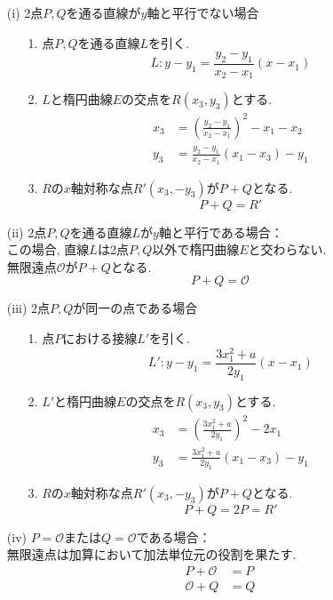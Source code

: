 \begin{enumerate}
  \item[(i)　] 2点$P,Q$を通る直線が$y$軸と平行でない場合%
  \begin{enumerate}
    \item[1.　] 点$P,Q$を通る直線$L$を引く.
    \[
      L : y-y_1 = \frac{y_2-y_1}{x_2-x_1}(x-x_1)
    \]
    \item[2.　] $L$と楕円曲線$E$の交点を$R(x_3,y_3)$とする.
    \[
    \begin{aligned}
      x_3 &= \left(\frac{y_2-y_1}{x_2-x_1}\right)^2-x_1-x_2\\
      y_3 &= \frac{y_2-y_1}{x_2-x_1}(x_1-x_3)-y_1
    \end{aligned}
    \]
    \item[3.　] $R$の$x$軸対称な点$R'(x_3,-y_3)$が$P+Q$となる.
    \[
      P+Q=R'
    \]
  \end{enumerate}
  \item[(ii)　] 2点$P,Q$を通る直線$L$が$y$軸と平行である場合：\\
  \indent この場合, 直線$L$は2点$P,Q$以外で楕円曲線$E$と交わらない.\\ 
  \indent 無限遠点$\mathcal{O}$が$P+Q$となる.
  \[
    P+Q=\mathcal{O}
  \]
  \item[(iii)　] 2点$P,Q$が同一の点である場合%
  \begin{enumerate}
    \item[1.　] 点$P$における接線$L'$を引く. 
    \[
      L' : y-y_1 = \frac{3x_1^2 + a}{2y_1}(x - x_1)
    \] 
    \item[2.　] $L'$と楕円曲線$E$の交点を$R(x_3,y_3)$とする.
    \[
    \begin{aligned}
      x_3 &= \left(\frac{3x_1^2 + a}{2y_1}\right)^2-2x_1\\
      y_3 &= \frac{3x_1^2 + a}{2y_1}(x_1-x_3)-y_1
    \end{aligned}
    \]
    \item[3.　] $R$の$x$軸対称な点$R'(x_3,-y_3)$が$P+Q$となる.
    \[
      P+Q=2P=R'
    \]
  \end{enumerate}
  \item[(iv)　] $P=\mathcal{O}$または$Q=\mathcal{O}$である場合：\\
  \indent 無限遠点は加算において加法単位元の役割を果たす.
  \[
  \begin{aligned}
    P+\mathcal{O}&=P\\
    \mathcal{O}+Q&=Q
  \end{aligned}
  \]    
\end{enumerate}
